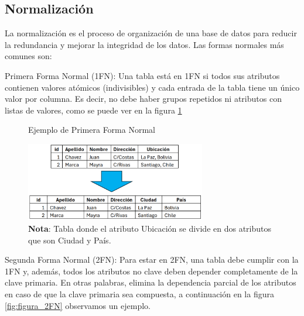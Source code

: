 	\subsection{Normalización}
		La normalización es el proceso de organización de una base de datos para reducir la redundancia y mejorar la integridad de los datos. Las formas normales más comunes son:
		
		Primera Forma Normal (1FN): Una tabla está en 1FN si todos sus atributos contienen valores atómicos (indivisibles) y cada entrada de la tabla tiene un único valor por columna. Es decir, no debe haber grupos repetidos ni atributos con listas de valores, como se puede ver en la figura \ref{fig:figura_1FN}\\
		
		\vspace{0.3cm} %
		
		\begin{figure}[!h] %
			\caption[Ejemplo Primera Forma Normal]
			{\newline Ejemplo de Primera Forma Normal} %
			\vspace{-0.2cm}
			\centering
			\includegraphics[width=0.7\textwidth]{imagenes/normalizacion/1FN.png} %
			\vspace{0.3cm}
			\caption*{\textup{\textbf{Nota}: Tabla donde el atributo Ubicación se divide en dos atributos que son Ciudad y País.}}
			\vspace{-0.75cm}
			\label{fig:figura_1FN} %
		\end{figure}
		
		Segunda Forma Normal (2FN): Para estar en 2FN, una tabla debe cumplir con la 1FN y, además, todos los atributos no clave deben depender completamente de la clave primaria. En otras palabras, elimina la dependencia parcial de los atributos en caso de que la clave primaria sea compuesta, a continuación en la figura \ref{fig:figura_2FN} observamos un ejemplo.
		
